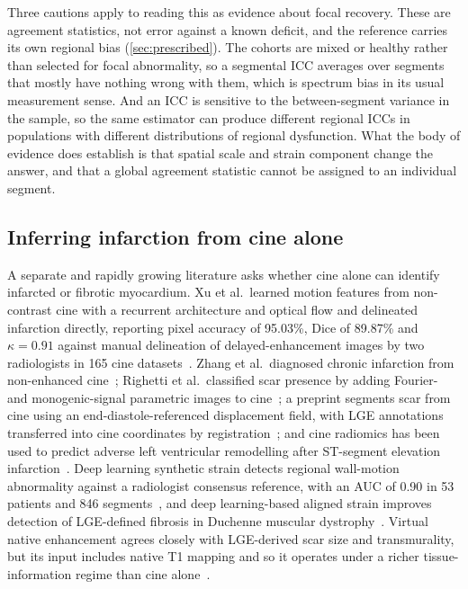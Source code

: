 Three cautions apply to reading this as evidence about focal recovery. These are agreement
statistics, not error against a known deficit, and the reference carries its own regional bias
(\cref{sec:prescribed}). The cohorts are mixed or healthy rather than selected for focal
abnormality, so a segmental ICC averages over segments that mostly have nothing wrong with them,
which is spectrum bias in its usual measurement sense.
And an ICC is sensitive to the between-segment variance in the sample, so the same estimator can
produce different regional ICCs in populations with different distributions of regional
dysfunction. What the body of evidence does establish is that spatial scale and strain component
change the answer, and that a global agreement statistic cannot be assigned to an individual
segment.

\subsection{Inferring infarction from cine alone}\label{sec:cineonly}

A separate and rapidly growing literature asks whether cine alone can identify infarcted or fibrotic
myocardium. Xu et al.\ learned motion features from non-contrast cine with a recurrent architecture
and optical flow and delineated infarction directly, reporting pixel accuracy of 95.03\%, Dice of
89.87\% and $\kappa=0.91$ against manual delineation of delayed-enhancement images by two
radiologists in 165 cine datasets~\citep{xu2018}. Zhang et al.\ diagnosed chronic infarction from
non-enhanced cine~\citep{zhang2019mi}; Righetti et al.\ classified scar presence by adding
Fourier- and monogenic-signal parametric images to cine~\citep{righetti2024}; a preprint
segments scar from cine using an end-diastole-referenced displacement field, with LGE annotations
transferred into cine coordinates by registration~\citep{yang2025fusion}; and cine radiomics has
been used to predict adverse left ventricular remodelling after ST-segment elevation
infarction~\citep{xin2023}. Deep learning synthetic
strain detects regional wall-motion abnormality against a radiologist consensus reference, with an
AUC of 0.90 in 53 patients and 846 segments~\citep{masutani2023dlss}, and deep learning-based
aligned strain improves detection of LGE-defined fibrosis in Duchenne muscular
dystrophy~\citep{koehler2025alignedstrain}. Virtual native enhancement agrees closely with
LGE-derived scar size and transmurality, but its input includes native T1 mapping and so it operates
under a richer tissue-information regime than cine alone~\citep{zhang2022vne}.

